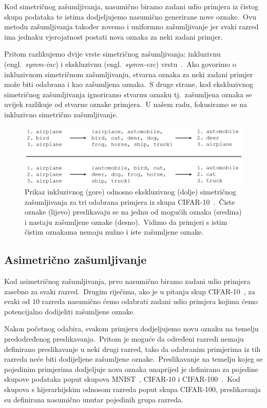 \documentclass[diplomskirad]{fer}
\begin{document}
Kod simetričnog zašumljivanja, nasumično biramo zadani udio primjera iz čistog skupa podataka te istima dodjeljujemo nasumično generirane nove oznake.\ 
Ovu metodu zašumljivanja također zovemo i uniformno zašumljivanje jer svaki razred ima jednaku vjerojatnost postati nova oznaka za neki zadani primjer.\ 
  
Pritom razlikujemo dvije vrste simetričnog zašumljivanja: inkluzivnu (engl.\ \textit{symm-inc}) i ekskluzivnu (engl.\ \textit{symm-exc}) vrstu~\cite{cordeiro2020survey}.\ 
Ako govorimo o inkluzivnom simetričnom zašumljivanju, stvarna oznaka za neki zadani primjer može biti odabrana i kao zašumljena oznaka.\ 
S druge strane, kod ekskluzivnog simetričnog zašumljivanja ignoriramo stvarnu oznaku tj.\ zašumljena oznaka se uvijek razlikuje od stvarne oznake primjera.\ 
U našem radu, fokusiramo se na inkluzivno simetrično zašumljivanje.\ 

\pagebreak

\begin{figure}[h]
  \centering
  \includegraphics[scale=0.7]{./Slike/sym.png}
  \caption{Prikaz inkluzivnog (gore) odnosno ekskluzivnog (dolje) simetričnog zašumljivanja za tri odabrana primjera iz skupa CIFAR-10~\cite{krizhevsky2009learning}.\ Čiste oznake (lijevo) preslikavaju se na jednu od mogućih oznaka (sredina) i nastaju zašumljene oznake (desno).\ Vidimo da primjeri s istim čistim oznakama nemaju nužno i iste zašumljene oznake.}
  \label{fig:sym}
\end{figure}

\subsection{Asimetrično zašumljivanje}
\label{sub:asim}

Kod asimetričnog zašumljivanja, prvo nasumično biramo zadani udio primjera zasebno za svaki razred.\ 
Drugim riječima, ako je u pitanju skup CIFAR-10~\cite{krizhevsky2009learning}, za svaki od $10$ razreda nasumično ćemo odabrati zadani udio primjera kojima ćemo potencijalno dodijeliti zašumljene oznake.\ 

Nakon početnog odabira, svakom primjeru dodjeljujemo novu oznaku na temelju predodređenog preslikavanja.\ 
Pritom je moguće da određeni razredi nemaju definirano preslikavanje u neki drugi razred, tako da odabranim primjerima iz tih razreda neće biti dodijeljene zašumljene oznake.\ 
Preslikavanje na temelju kojeg se pojedinim primjerima dodjeljuje nova oznaka unaprijed je definirano za pojedine skupove podataka poput skupova MNIST~\cite{deng2012mnist}, CIFAR-10 i CIFAR-100~\cite{krizhevsky2009learning}.\ 
Kod skupova s hijerarhijskim odnosom razreda poput skupa CIFAR-100, preslikavanja su definirana nasumično unutar pojedinih grupa razreda.\ 
\end{document}
